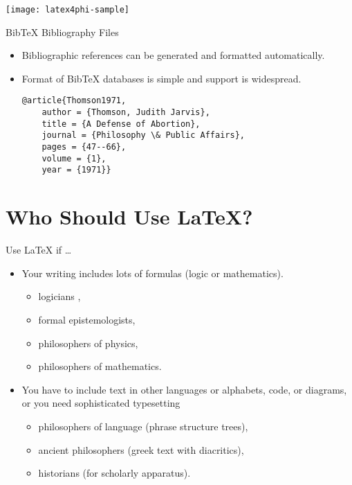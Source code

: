 \begin{frame}

\texttt{[image: latex4phi-sample]}
\end{frame}

\begin{frame}[fragile]{Bib\TeX{} Bibliography Files}

\begin{itemize}
\item Bibliographic references can be generated and formatted automatically.
\item Format of Bib\TeX{} databases is simple and support is widespread.
\begin{verbatim}
@article{Thomson1971,
    author = {Thomson, Judith Jarvis},
    title = {A Defense of Abortion},
    journal = {Philosophy \& Public Affairs},
    pages = {47--66},
    volume = {1},
    year = {1971}}
\end{verbatim}
\end{itemize}
\end{frame}

\section{Who Should Use \LaTeX{}?}


\begin{frame}{Use \LaTeX{} if \dots }

\begin{itemize}
\item Your writing includes lots of formulas (logic or mathematics). 
  \begin{itemize}
  \item logicians ,
  \item formal epistemologists,
  \item philosophers of physics,
  \item philosophers of mathematics.
  \end{itemize}

\item You have to include text in other languages or alphabets, code,
or diagrams, or you need sophisticated typesetting 
\begin{itemize}
\item philosophers of language (phrase structure trees),
\item ancient philosophers (greek text with diacritics),
\item historians (for scholarly apparatus).
\end{itemize}

\end{itemize}

\end{frame}

